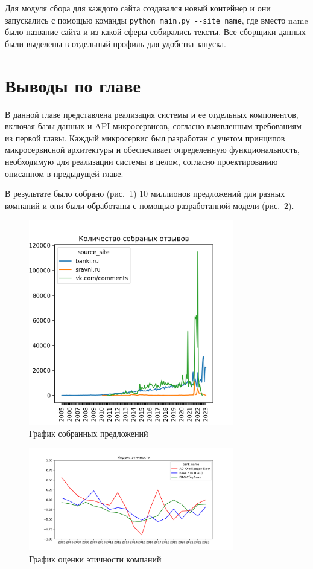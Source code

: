 \documentclass[PI, VKR]{HSEUniversity}
\begin{document}
Для модуля сбора для каждого сайта создавался новый контейнер и они запускались с помощью команды \texttt{python main.py -{}-site name}, где вместо name было название сайта и из какой сферы собирались тексты. Все сборщики данных были выделены в отдельный профиль для удобства запуска.
\section{Выводы по главе}
\label{sec:orgdfb3a5f}
В данной главе представлена реализация системы и ее отдельных компонентов, включая базы данных и API микросервисов, согласно выявленным требованиям из первой главы. Каждый микросервис был разработан с учетом принципов микросервисной архитектуры и обеспечивает определенную функциональность, необходимую для реализации системы в целом, согласно проектированию описанном в предыдущей главе.

В результате было собрано (рис.~\ref{fig:collected_data}) 10 миллионов предложений для разных компаний и они были обработаны с помощью разработанной модели (рис.~\ref{fig:ethics_analisys}).

\begin{figure}[h!]
\centering
\includegraphics[width=0.8\textwidth]{img/reviews_count.png}
\caption{\label{fig:collected_data}График собранных предложений}
\end{figure}

\begin{figure}[h!]
\centering
\includegraphics[width=0.8\textwidth]{img/ethics_plot_index_safe.png}
\caption{\label{fig:ethics_analisys}График оценки этичности компаний}
\end{figure}
\end{document}
